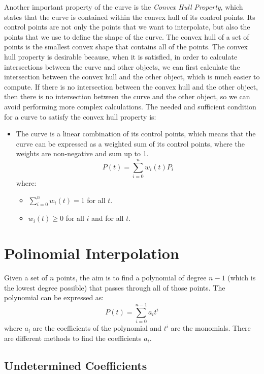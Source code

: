 Another important property of the curve is the \emph{Convex Hull Property}, which states that the curve is contained within the convex hull of its control points. Its control points are not only the points that we want to interpolate, but also the points that we use to define the shape of the curve. The convex hull of a set of points is the smallest convex shape that contains all of the points. The convex hull property is desirable because, when it is satisfied, in order to calculate intersections between the curve and other objects, we can first calculate the intersection between the convex hull and the other object, which is much easier to compute. If there is no intersection between the convex hull and the other object, then there is no intersection between the curve and the other object, so we can avoid performing more complex calculations. The needed and sufficient condition for a curve to satisfy the convex hull property is:
\begin{itemize}
    \item The curve is a linear combination of its control points, which means that the curve can be expressed as a weighted sum of its control points, where the weights are non-negative and sum up to 1.
    \begin{equation*}
        P(t) = \sum_{i=0}^{n} w_i(t) P_i
    \end{equation*}
    where:
    \begin{itemize}
        \item $\sum\limits_{i=0}^{n} w_i(t) = 1$ for all $t$.
        \item $w_i(t) \geq 0$ for all $i$ and for all $t$.
    \end{itemize}
\end{itemize}


\section{Polinomial Interpolation}

Given a set of $n$ points, the aim is to find a polynomial of degree $n-1$ (which is the lowest degree possible) that passes through all of those points. The polynomial can be expressed as:
\[P(t) = \sum_{i=0}^{n-1} a_i t^i\]
where $a_i$ are the coefficients of the polynomial and $t^i$ are the monomials. There are different methods to find the coefficients $a_i$.

\subsection{Undetermined Coefficients}

